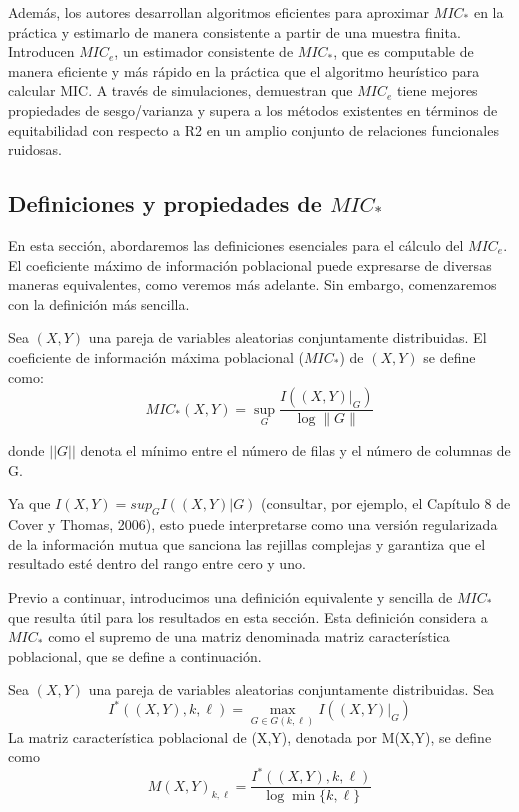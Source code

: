 	Adem\'as, los autores desarrollan algoritmos eficientes para aproximar $MIC_*$ en la pr\'actica y estimarlo de manera consistente a partir de una muestra finita. Introducen $MIC_e$, un estimador consistente de $MIC_*$, que es computable de manera eficiente y m\'as r\'apido en la pr\'actica que el algoritmo heur\'istico para calcular MIC. A trav\'es de simulaciones, demuestran que $MIC_e$ tiene mejores propiedades de sesgo/varianza y supera a los m\'etodos existentes en t\'erminos de equitabilidad con respecto a R2 en un amplio conjunto de relaciones funcionales ruidosas.

	\subsection[short]{Definiciones y propiedades de $MIC_*$}

	En esta secci\'on, abordaremos las definiciones esenciales para el c\'alculo del $MIC_e$. El coeficiente m\'aximo de informaci\'on poblacional puede expresarse de diversas maneras equivalentes, como veremos m\'as adelante. Sin embargo, comenzaremos con la definici\'on m\'as sencilla.

	\begin{defn}
		Sea $(X,Y)$ una pareja de variables aleatorias conjuntamente distribuidas. El coeficiente de informaci\'on m\'axima poblacional ($MIC_*$) de $(X,Y)$ se define como:
		$$
		M I C_*(X, Y)=\sup _G \frac{I\left(\left.(X, Y)\right|_G\right)}{\log \|G\|}
		$$
		
		donde $||G||$ denota el m\'inimo entre el n\'umero de filas y el n\'umero de columnas de G.
	\end{defn}
	
	Ya que $I(X,Y) = sup_G I((X,Y)|G)$ (consultar, por ejemplo, el Cap\'itulo 8 de Cover y Thomas, 2006), esto puede interpretarse como una versi\'on regularizada de la informaci\'on mutua que sanciona las rejillas complejas y garantiza que el resultado est\'e dentro del rango entre cero y uno.
	
	Previo a continuar, introducimos una definici\'on equivalente y sencilla de $MIC_*$ que resulta \'util para los resultados en esta secci\'on. Esta definici\'on considera a $MIC_*$ como el supremo de una matriz denominada matriz caracter\'istica poblacional, que se define a continuaci\'on.
	
	\begin{defn}
		Sea $(X,Y)$ una pareja de variables aleatorias conjuntamente distribuidas. Sea
		$$
		I^*((X, Y), k, \ell)=\max _{G \in G(k, \ell)} I\left(\left.(X, Y)\right|_G\right)
		$$
		La matriz caracter\'istica poblacional de (X,Y), denotada por M(X,Y), se define como
		$$
		M(X, Y)_{k, \ell}=\frac{I^*((X, Y), k, \ell)}{\log \min \{k, \ell\}}
		$$
	\end{defn}
	
